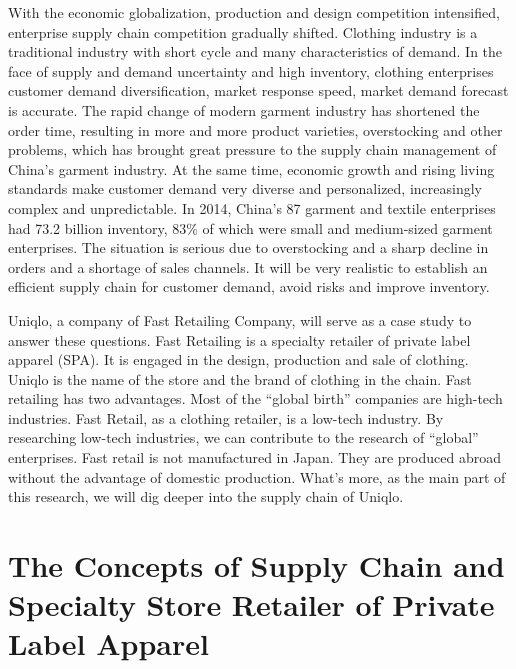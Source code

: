 \documentclass[12pt,]{article}
\begin{document}
With the economic globalization, production and design competition
intensified, enterprise supply chain competition gradually shifted.
Clothing industry is a traditional industry with short cycle and many
characteristics of demand. In the face of supply and demand uncertainty
and high inventory, clothing enterprises customer demand
diversification, market response speed, market demand forecast is
accurate. The rapid change of modern garment industry has shortened the
order time, resulting in more and more product varieties, overstocking
and other problems, which has brought great pressure to the supply chain
management of China's garment industry. At the same time, economic
growth and rising living standards make customer demand very diverse and
personalized, increasingly complex and unpredictable. In 2014, China's
87 garment and textile enterprises had 73.2 billion inventory, 83\% of
which were small and medium-sized garment enterprises. The situation is
serious due to overstocking and a sharp decline in orders and a shortage
of sales channels. It will be very realistic to establish an efficient
supply chain for customer demand, avoid risks and improve inventory.

Uniqlo, a company of Fast Retailing Company, will serve as a case study
to answer these questions. Fast Retailing is a specialty retailer of
private label apparel (SPA). It is engaged in the design, production and
sale of clothing. Uniqlo is the name of the store and the brand of
clothing in the chain. Fast retailing has two advantages. Most of the
``global birth'' companies are high-tech industries. Fast Retail, as a
clothing retailer, is a low-tech industry. By researching low-tech
industries, we can contribute to the research of ``global'' enterprises.
Fast retail is not manufactured in Japan. They are produced abroad
without the advantage of domestic production. What's more, as the main
part of this research, we will dig deeper into the supply chain of
Uniqlo.

\hypertarget{the-concepts-of-supply-chain-and-specialty-store-retailer-of-private-label-apparel}{%
\section{The Concepts of Supply Chain and Specialty Store Retailer of
Private Label
Apparel}\label{the-concepts-of-supply-chain-and-specialty-store-retailer-of-private-label-apparel}}
\end{document}
